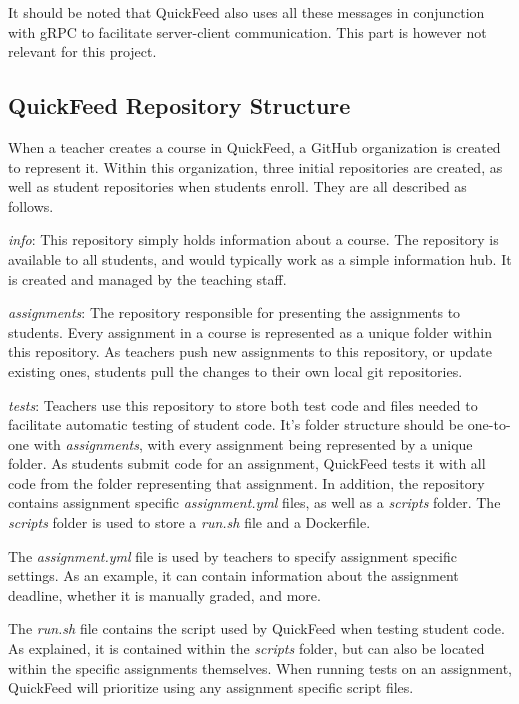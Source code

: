 It should be noted that QuickFeed also uses all these messages in conjunction with gRPC to facilitate server-client communication.
This part is however not relevant for this project.

\subsection{QuickFeed Repository Structure}
\label{sec:quickfeed-repository-structure}

When a teacher creates a course in QuickFeed, a GitHub organization is created to represent it.
Within this organization, three initial repositories are created, as well as student repositories when students enroll.
They are all described as follows.

\textit{info}: This repository simply holds information about a course.
The repository is available to all students, and would typically work as a simple information hub.
It is created and managed by the teaching staff.

\textit{assignments}: The repository responsible for presenting the assignments to students.
Every assignment in a course is represented as a unique folder within this repository.
As teachers push new assignments to this repository, or update existing ones, students pull the changes to their own local git repositories.

\textit{tests}: Teachers use this repository to store both test code and files needed to facilitate automatic testing of student code.
It's folder structure should be one-to-one with \textit{assignments}, with every assignment being represented by a unique folder.
As students submit code for an assignment, QuickFeed tests it with all code from the folder representing that assignment.
In addition, the repository contains assignment specific \textit{assignment.yml} files, as well as a \textit{scripts} folder.
The \textit{scripts} folder is used to store a \textit{run.sh} file and a Dockerfile.

The \textit{assignment.yml} file is used by teachers to specify assignment specific settings.
As an example, it can contain information about the assignment deadline, whether it is manually graded, and more.

The \textit{run.sh} file contains the script used by QuickFeed when testing student code.
As explained, it is contained within the \textit{scripts} folder, but can also be located within the specific assignments themselves.
When running tests on an assignment, QuickFeed will prioritize using any assignment specific script files.

